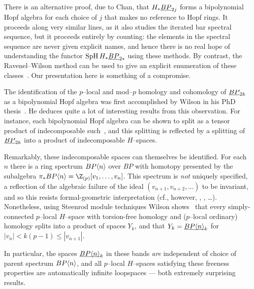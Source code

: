 \begin{remark}
There is an alternative proof, due to Chan, that $H_* \underline{\smash{BP}}_{2j}$ forms a bipolynomial Hopf algebra for each choice of $j$ that makes no reference to Hopf rings.  It proceeds along very similar lines, as it also studies the iterated bar spectral sequence, but it proceeds entirely by counting: the elements in the spectral sequence are never given explicit names, and hence there is no real hope of understanding the functor $\operatorname{SpH} H_* \underline{\smash{BP}}_{2*}$ using these methods.  By contrast, the Ravenel--Wilson method can be used to give an explicit enumeration of these classes~\cite[Section 5]{RavenelWilsonHopfRingForMU}.  Our presentation here is something of a compromise.
\end{remark}

\begin{remark}
The identification of the $p$--local and mod--$p$ homology and cohomology of $\underline{\smash{BP}}_{2k}$ as a bipolynomial Hopf algebra was first accomplished by Wilson in his PhD thesis~\cite[Theorem 3.3]{WilsonThesisI}.  He deduces quite a lot of interesting results from this observation.  For instance, each bipolynomial Hopf algebra can be shown to split as a tensor product of indecomposable such~\cite[Proposition 3.5]{WilsonThesisI}, and this splitting is reflected by a splitting of $\underline{\smash{BP}}_{2k}$ into a product of indecomposable $H$--spaces.

Remarkably, these indecomposable spaces can themselves be identified.  For each $n$ there is a ring spectrum $BP\langle n\rangle$ over $BP$ with homotopy presented by the subalgebra $\pi_* BP\<n\> = \Z_{(p)}[v_1, \ldots, v_n]$.  This spectrum is \emph{not} uniquely specified, a reflection of the algebraic failure of the ideal $(v_{n+1}, v_{n+2}, \ldots)$ to be invariant, and so this resists formal-geometric interpretation (cf., however, \cite{LawsonNaumann}, \cite{StricklandProductsOnModules}, \ldots).  Nonetheless, using Steenrod module techniques Wilson shows~\cite[Section 6]{WilsonThesisII} that every simply-connected $p$--local $H$--space with torsion-free homology and ($p$--local ordinary) homology splits into a product of spaces $Y_k$, and that $Y_k = \underline{\smash{BP\langle n\rangle}}_{k}$ for $|v_n| < k(p-1) \le |v_{n+1}|$.

In particular, the spaces $\underline{\smash{BP\langle n\rangle}}_{k}$ in these bands \emph{are} independent of choice of parent spectrum $BP\langle n\rangle$, and all $p$--local $H$--spaces satisfying these freeness properties are automatically infinite loopspaces --- both extremely surprising results.
\end{remark}

